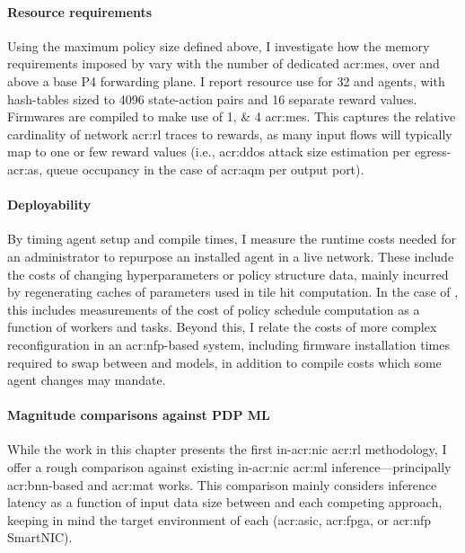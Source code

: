 \paragraph{Resource requirements}
Using the maximum policy size defined above, I investigate how the memory requirements imposed by \approachshort{} vary with the number of dedicated \glspl{acr:me}, over and above a base P4 forwarding plane.
I report resource use for \qty{32}{\bit} \Indfw{} and \Coopfw{} agents, with hash-tables sized to \num{4096} state-action pairs and \num{16} separate reward values.
Firmwares are compiled to make use of \numlist{1;4} \glspl{acr:me}.
This captures the relative cardinality of network \gls{acr:rl} traces to rewards, as many input flows will typically map to one or few reward values (i.e., \gls{acr:ddos} attack size estimation per egress-\gls{acr:as}, queue occupancy in the case of \gls{acr:aqm} per output port).


\paragraph{Deployability}
By timing agent setup and compile times, I measure the runtime costs needed for an administrator to repurpose an installed agent in a live network.
These include the costs of changing hyperparameters or policy structure data, mainly incurred by regenerating caches of parameters used in tile hit computation.
In the case of \coopfw{}, this includes measurements of the cost of policy schedule computation as a function of workers and tasks.
Beyond this, I relate the costs of more complex reconfiguration in an \gls{acr:nfp}-based system, including firmware installation times required to swap between \coopfw{} and \indfw{} models, in addition to compile costs which some agent changes may mandate.

\paragraph{Magnitude comparisons against PDP ML}
While the work in this chapter presents the first in-\gls{acr:nic} \gls{acr:rl} methodology, I offer a rough comparison against existing in-\gls{acr:nic} \gls{acr:ml} inference---principally \gls{acr:bnn}-based and \gls{acr:mat} works.
This comparison mainly considers inference latency as a function of input data size between \approachshort{} and each competing approach, keeping in mind the target environment of each (\gls{acr:asic}, \gls{acr:fpga}, or \gls{acr:nfp} SmartNIC).

